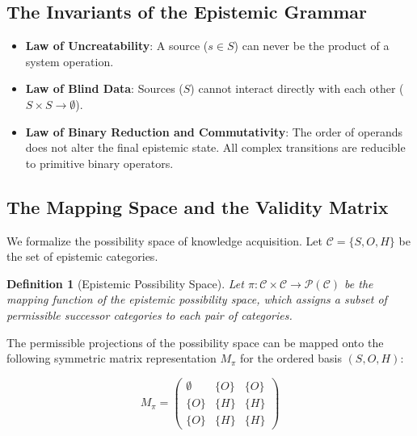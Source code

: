 \documentclass[11pt, a4paper]{article}
\newtheorem{definition}{Definition}
\begin{document}
	\subsection{The Invariants of the Epistemic Grammar}
	\begin{itemize}
		\item \textbf{Law of Uncreatability}: A source ($s \in S$) can never be the product of a system operation.
		\item \textbf{Law of Blind Data}: Sources ($S$) cannot interact directly with each other ($S \times S \to \emptyset$).
		\item \textbf{Law of Binary Reduction and Commutativity}: The order of operands does not alter the final epistemic state. All complex transitions are reducible to primitive binary operators.
	\end{itemize}
	
	\subsection{The Mapping Space and the Validity Matrix}
	We formalize the possibility space of knowledge acquisition. Let $\mathcal{C} = \{S, O, H\}$ be the set of epistemic categories.
	
	\begin{definition}[Epistemic Possibility Space]
		Let $\pi: \mathcal{C} \times \mathcal{C} \to \mathcal{P}(\mathcal{C})$ be the mapping function of the epistemic possibility space, which assigns a subset of permissible successor categories to each pair of categories.
	\end{definition}
	
	The permissible projections of the possibility space can be mapped onto the following symmetric matrix representation $M_\pi$ for the ordered basis $(S, O, H)$:
	
	\[
	M_\pi = \begin{pmatrix}
		\emptyset & \{O\} & \{O\} \\
		\{O\} & \{H\} & \{H\} \\
		\{O\} & \{H\} & \{H\}
	\end{pmatrix}
	\]
	
\end{document}
